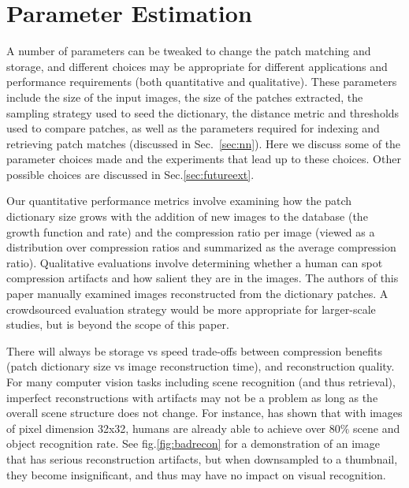 \section{Parameter Estimation}\label{sec:analysis}

A number of parameters can be tweaked to change the patch matching and storage, and different choices may be appropriate for different applications and performance requirements (both quantitative and qualitative). These parameters include the size of the input images, the size of the patches extracted, the sampling strategy used to seed the dictionary, the distance metric and thresholds used to compare patches, as well as the parameters required for indexing and retrieving patch matches (discussed in Sec.~\ref{sec:nn}). Here we discuss some of the parameter choices made and the experiments that lead up to these choices. Other possible choices are discussed in Sec.\ref{sec:futureext}.

Our quantitative performance metrics involve examining how the patch dictionary size grows with the addition of new images to the database (the growth function and rate) and the compression ratio per image (viewed as a distribution over compression ratios and summarized as the average compression ratio). Qualitative evaluations involve determining whether a human can spot compression artifacts and how salient they are in the images. The authors of this paper manually examined images reconstructed from the dictionary patches. A crowdsourced evaluation strategy would be more appropriate for larger-scale studies, but is beyond the scope of this paper.

There will always be storage vs speed trade-offs between compression benefits (patch dictionary size vs image reconstruction time), and reconstruction quality. For many computer vision tasks including scene recognition (and thus retrieval), imperfect reconstructions with artifacts may not be a problem as long as the overall scene structure does not change. For instance, \cite{tiny_images} has shown that with images of pixel dimension 32x32, humans are already able to achieve over $80\%$ scene and object recognition rate. See fig.\ref{fig:badrecon} for a demonstration of an image that has serious reconstruction artifacts, but when downsampled to a thumbnail, they become insignificant, and thus may have no impact on visual recognition.

